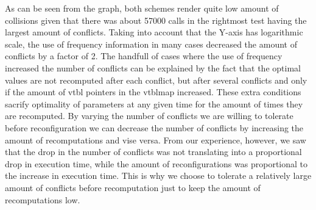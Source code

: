 As can be seen from the graph, both schemes render quite low amount of 
collisions given that there was about 57000 calls in the rightmost test having 
the largest amount of conflicts. Taking into account that the Y-axis has 
logarithmic scale, the use of frequency information in many cases decreased the 
amount of conflicts by a factor of 2. The handfull of cases where the use of 
frequency increased the number of conflicts can be explained by the fact that 
the optimal values are not recomputed after each conflict, but after several 
conflicts and only if the amount of vtbl pointers in the vtblmap increased. These 
extra conditions sacrify optimality of parameters at any given time for the amount 
of times they are recomputed. By varying the number of conflicts we are willing 
to tolerate before reconfiguration we can decrease the number of conflicts by 
increasing the amount of recomputations and vise versa. From our experience, 
however, we saw that the drop in the number of conflicts was not translating 
into a proportional drop in execution time, while the amount of reconfigurations 
was proportional to the increase in execution time. This is why we choose to 
tolerate a relatively large amount of conflicts before recomputation just to 
keep the amount of recomputations low.
